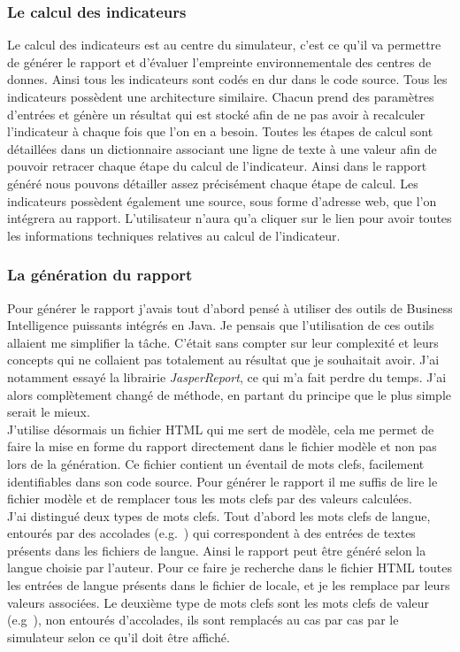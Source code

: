 \subsubsection{Le calcul des indicateurs}
Le calcul des indicateurs est au centre du simulateur, c'est ce qu'il va permettre de générer le rapport et d'évaluer l'empreinte environnementale des centres de donnes. Ainsi tous les indicateurs sont codés \og en dur \fg{} dans le code source. Tous les indicateurs possèdent une architecture similaire. Chacun prend des paramètres d'entrées et génère un résultat qui est stocké afin de ne pas avoir à recalculer l'indicateur à chaque fois que l'on en a besoin. Toutes les étapes de calcul sont détaillées dans un dictionnaire associant une ligne de texte à une valeur afin de pouvoir retracer chaque étape du calcul de l'indicateur. Ainsi dans le rapport généré nous pouvons détailler assez précisément chaque étape de calcul. Les indicateurs possèdent également une source, sous forme d'adresse web, que l'on intégrera au rapport. L'utilisateur n'aura qu'a cliquer sur le lien pour avoir toutes les informations techniques relatives au calcul de l'indicateur.

\subsubsection{La génération du rapport}
Pour générer le rapport j'avais tout d'abord pensé à utiliser des outils de Business Intelligence puissants intégrés en Java. Je pensais que l'utilisation de ces outils allaient me simplifier la tâche. C'était sans compter sur leur complexité et leurs concepts qui ne collaient pas totalement au résultat que je souhaitait avoir. J'ai notamment essayé la librairie \emph{JasperReport}, ce qui m'a fait perdre du temps.
J'ai alors complètement changé de méthode, en partant du principe que le plus simple serait le mieux.\\
J'utilise désormais un fichier HTML qui me sert de modèle, cela me permet de faire la mise en forme du rapport directement dans le fichier modèle et non pas lors de la génération. Ce fichier contient un éventail de mots clefs, facilement identifiables dans son code source. Pour générer le rapport il me suffis de lire le fichier modèle et de remplacer tous les mots clefs par des valeurs calculées.\\
J'ai distingué deux types de mots clefs. Tout d'abord les mots clefs de langue, entourés par des accolades (e.g.\ ) qui correspondent à des entrées de textes présents dans les fichiers de langue. Ainsi le rapport peut être généré selon la langue choisie par l'auteur. Pour ce faire je recherche dans le fichier HTML toutes les entrées de langue présents dans le fichier de locale, et je les remplace par leurs valeurs associées. Le deuxième type de mots clefs sont les mots clefs de valeur (e.g\ ), non entourés d'accolades, ils sont remplacés au cas par cas par le simulateur selon ce qu'il doit être affiché.\\

